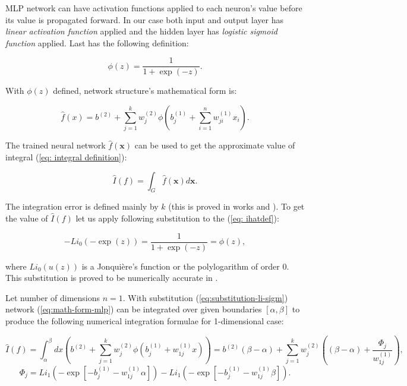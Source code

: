 \documentclass[%
]{ittmm}
\begin{document}
MLP network can have activation functions applied to each neuron's value before its value is propagated forward. In our case both input and output layer has \textit{linear activation function} applied and the hidden layer has \textit{logistic sigmoid function} applied. Last has the following definition:

\begin{equation}
    \label{eq:sigmoid}
    \phi(z) = \frac{1}{1+\exp(-z)}.
\end{equation}

\noindent With $\phi(z)$ defined, network structure's mathematical form is:

\begin{equation}
    \label{eq:math-form-mlp}
    \hat{f}(x) = b^{(2)} + \sum_{j=1}^{k}w_j^{(2)}\phi(b_j^{(1)}+\sum_{i=1}^{n}w_{ji}^{(1)}x_{i}).
\end{equation}

\noindent The trained neural network $\hat{f}(\mathbf{x})$ can be used to get the approximate value of integral (\ref{eq: integral definition}):

\begin{equation}
    \label{eq: ihatdef}
    \hat{I}(f) = \int_G \hat{f}(\mathbf{x})d\mathbf{x}.
\end{equation}

\noindent The integration error is defined mainly by $k$ (this is proved in works \cite{lloyd2020using} and \cite{cybenko1989approximation}). To get the value of $\hat{I}(f)$ let us apply following substitution to the (\ref{eq: ihatdef}):

\begin{equation}
    \label{eq:substitution-li-sigm}
    -Li_0(-\exp(z)) = \frac{1}{1+\exp(-z)} = \phi(z),
\end{equation}

\noindent where $Li_0(u(z))$ is a Jonquière's function or the polylogarithm of order 0. This substitution is proved to be numerically accurate in \cite{lloyd2020using}.

Let number of dimensions $n = 1$. With substitution (\ref{eq:substitution-li-sigm}) network (\ref{eq:math-form-mlp}) can be integrated over given boundaries $[\alpha, \beta]$ to produce the following numerical integration formulae for 1-dimensional case:

\begin{equation}
	\label{eq:numerical_method_1}
	\hat{I}(f) = \int_{\alpha}^{\beta} dx \left(b^{(2)} + \sum_{j=1}^{k}w_j^{(2)}\phi(b_j^{(1)} + w_{1j}^{(1)}x) \right) = b^{(2)}(\beta - \alpha) + \sum_{j=1}^{k}w_j^{(2)} \left( (\beta - \alpha) + \frac{\Phi_j}{w_{1j}^{(1)}} \right),
\end{equation}
\begin{equation}
	\label{eq:numerical_method_last}
	\Phi_j = Li_1(-\exp[-b_j^{(1)}-w_{1j}^{(1)}\alpha]) - Li_1(-\exp[-b_j^{(1)}-w_{1j}^{(1)}\beta]).
\end{equation}
\end{document}
